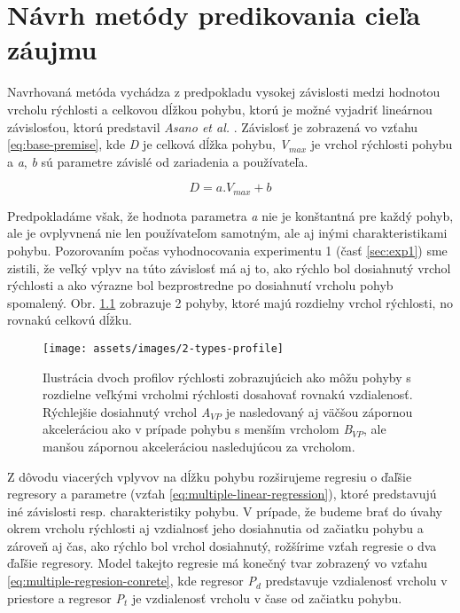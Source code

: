 \chapter{Návrh metódy predikovania cieľa záujmu\label{cha:proposal}}

Navrhovaná metóda vychádza z predpokladu vysokej závislosti medzi hodnotou vrcholu rýchlosti a celkovou dĺžkou pohybu, ktorú je možné vyjadriť lineárnou závislosťou, ktorú predstavil \emph{Asano et al.} \cite{asano2005predictive}. Závislosť je zobrazená vo vzťahu \ref{eq:base-premise}, kde \emph{D} je celková dĺžka pohybu, \emph{V$_{max}$} je vrchol rýchlosti pohybu a \emph{a}, \emph{b} sú parametre závislé od zariadenia a používateľa.

\begin{equation}
D = a.V_{max} + b
\label{eq:base-premise}
\end{equation}

Predpokladáme však, že hodnota parametra \emph{a} nie je konštantná pre každý pohyb, ale je ovplyvnená nie len používateľom samotným, ale aj inými charakteristikami pohybu. Pozorovaním počas vyhodnocovania experimentu 1 (časť \ref{sec:exp1}) sme zistili, že veľký vplyv na túto závislosť má aj to, ako rýchlo bol dosiahnutý vrchol rýchlosti a ako výrazne bol bezprostredne po dosiahnutí vrcholu pohyb spomalený. Obr. \ref{fig:2-types-profile} zobrazuje 2 pohyby, ktoré majú rozdielny vrchol rýchlosti, no rovnakú celkovú dĺžku.

\begin{figure}[h]
\centering
\texttt{[image: assets/images/2-types-profile]}
\par
\caption{Ilustrácia dvoch profilov rýchlosti zobrazujúcich ako môžu pohyby s rozdielne veľkými vrcholmi rýchlosti dosahovať rovnakú vzdialenosť. Rýchlejšie dosiahnutý vrchol \emph{A$_{VP}$} je nasledovaný aj väčšou zápornou akceleráciou ako v prípade pohybu s menším vrcholom \emph{B$_{VP}$}, ale manšou zápornou akceleráciou nasledujúcou za vrcholom. \label{fig:2-types-profile}}
\end{figure}

Z dôvodu viacerých vplyvov na dĺžku pohybu rozširujeme regresiu o ďaľšie regresory a parametre (vzťah \ref{eq:multiple-linear-regression}), ktoré predstavujú iné závislosti resp. charakteristiky pohybu. V prípade, že budeme brať do úvahy okrem vrcholu rýchlosti aj vzdialnosť jeho dosiahnutia od začiatku pohybu a zároveň aj čas, ako rýchlo bol vrchol dosiahnutý, rožšírime vzťah regresie o dva ďaľšie regresory. Model takejto regresie má konečný tvar zobrazený vo vzťahu \ref{eq:multiple-regresion-conrete}, kde regresor \emph{P$_{d}$} predstavuje vzdialenosť vrcholu v priestore a regresor \emph{P$_{t}$} je vzdialenosť vrcholu v čase od začiatku pohybu.

